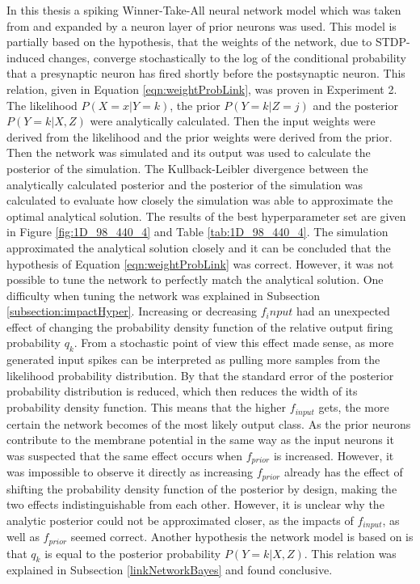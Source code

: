 In this thesis a spiking Winner-Take-All neural network model which was taken from \citet{nessler} and expanded by a neuron layer of prior neurons was used. This model is partially based on the hypothesis, that the weights of the network, due to STDP-induced changes, converge stochastically to the log of the conditional probability that a presynaptic neuron has fired shortly before the postsynaptic neuron. This relation, given in Equation \ref{eqn:weightProbLink}, was proven in Experiment 2. The likelihood $P(X=x|Y=k)$, the prior $P(Y=k|Z=j)$ and the posterior $P(Y = k|X, Z)$ were analytically calculated. Then the input weights were derived from the likelihood and the prior weights were derived from the prior. Then the network was simulated and its output was used to calculate the posterior of the simulation. The Kullback-Leibler divergence between the analytically calculated posterior and the posterior of the simulation was calculated to evaluate how closely the simulation was able to approximate the optimal analytical solution. The results of the best hyperparameter set are given in Figure \ref{fig:1D_98_440_4} and Table \ref{tab:1D_98_440_4}. The simulation approximated the analytical solution closely and it can be concluded that the hypothesis of Equation \ref{eqn:weightProbLink} was correct. However, it was not possible to tune the network to perfectly match the analytical solution. One difficulty when tuning the network was explained in Subsection \ref{subsection:impactHyper}. Increasing or decreasing $f_input$ had an unexpected effect of changing the probability density function of the relative output firing probability $q_k$. From a stochastic point of view this effect made sense, as more generated input spikes can be interpreted as pulling more samples from the likelihood probability distribution. By that the standard error of the posterior probability distribution is reduced, which then reduces the width of its probability density function. This means that the higher $f_{input}$ gets,  the more certain the network becomes of the most likely output class. As the prior neurons contribute to the membrane potential in the same way as the input neurons it was suspected that the same effect occurs when $f_{prior}$ is increased. However, it was impossible to observe it directly as increasing $f_{prior}$ already has the effect of shifting the probability density function of the posterior by design, making the two effects indistinguishable from each other. However, it is unclear why the analytic posterior could not be approximated closer, as the impacts of $f_{input}$, as well as $f_{prior}$ seemed correct.
Another hypothesis the network model is based on is that $q_k$ is equal to the posterior probability $P(Y = k|X, Z)$. This relation was explained in Subsection \ref{linkNetworkBayes} and found conclusive.

